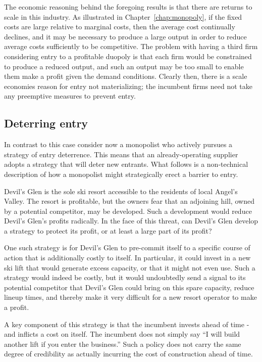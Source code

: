 The economic reasoning behind the foregoing results is that there are returns to scale in this industry. As illustrated in Chapter~\ref{chap:monopoly}, if the fixed costs are large relative to marginal costs, then the average cost continually declines, and it may be necessary to produce a large output in order to reduce average costs sufficiently to be competitive. The problem with having a third firm considering entry to a profitable duopoly is that each firm would be constrained to produce a reduced output, and such an output may be too small to enable them make a profit given the demand conditions. Clearly then, there is a scale economies reason for entry not materializing; the incumbent firms need not take any preemptive measures to prevent entry.

\subsection*{Deterring entry}

In contrast to this case consider now a monopolist who actively pursues a strategy of entry deterrence. This means that an already-operating supplier adopts a strategy that will deter new entrants. What follows is a non-technical description of how a monopolist might strategically erect a barrier to entry.

Devil's Glen is the sole ski resort accessible to the residents of local Angel's Valley. The resort is profitable, but the owners fear that an adjoining hill, owned by a potential competitor, may be developed. Such a development would reduce Devil's Glen's profits radically. In the face of this threat, can Devil's Glen develop a strategy to protect its profit, or at least a large part of its profit?

One such strategy is for Devil's Glen to pre-commit itself to a specific course of action that is additionally costly to itself. In particular, it could invest in a new ski lift that would generate excess capacity, or that it might not even use. Such a strategy would indeed be costly, but it would undoubtedly send a signal to its potential competitor that Devil's Glen could bring on this spare capacity, reduce lineup times, and thereby make it very difficult for a new resort operator to make a profit.

A key component of this strategy is that the incumbent invests ahead of time - and inflicts a cost on itself. The incumbent does not simply say ``I will build another lift if you enter the business.'' Such a policy does not carry the same degree of credibility as actually incurring the cost of construction ahead of time.

